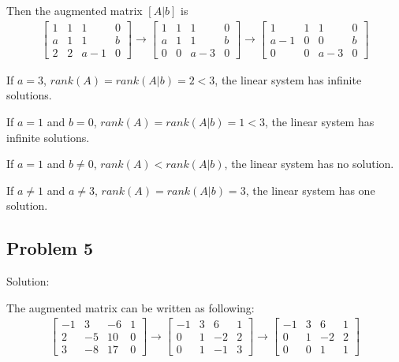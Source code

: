 \documentclass[letterpaper, 11pt]{article}
\newcommand{\1}{\mathds{1}}	%
\theoremstyle{definition}
\begin{document}
Then the augmented matrix $[A|b]$ is \begin{align*}
    \left[\begin{array}{ccc|c}
        1 & 1 & 1 & 0 \\
        a & 1 & 1 & b \\
        2 & 2 & a-1 & 0
    \end{array}\right] \to \left[\begin{array}{ccc|c}
        1 & 1 & 1 & 0 \\
        a & 1 & 1 & b \\
        0 & 0 & a-3 & 0
    \end{array}\right] \to \left[\begin{array}{ccc|c}
        1 & 1 & 1 & 0 \\
        a -1 & 0 & 0 & b \\
        0 & 0 & a-3 & 0
    \end{array}\right]
\end{align*}

If $a = 3$, $rank(A)=rank(A|b) = 2< 3$, the linear system has infinite solutions.

If $a = 1$ and $b = 0$, $rank(A)=rank(A|b) =1 < 3$, the linear system has infinite solutions.

If $a = 1$ and $b \neq 0$, $rank(A) < rank(A|b)$, the linear system has no solution.

If $a \neq 1$ and $a \neq 3$,  $rank(A)=rank(A|b) = 3$, the linear system has one solution.


\subsection*{Problem 5}

Solution:

The augmented matrix can be written as following:
\begin{align*}
    \left[\begin{array}{ccc|c}
        -1 & 3 & -6 & 1 \\
        2 & -5 & 10 & 0 \\
        3 & -8 & 17 & 0
    \end{array}\right] \to  \left[\begin{array}{ccc|c}
        -1 & 3 & 6 & 1 \\
        0 & 1 & -2 & 2 \\
        0 & 1 & -1 & 3
    \end{array}\right] \to \left[\begin{array}{ccc|c}
        -1 & 3 & 6 & 1 \\
        0 & 1 & -2 & 2 \\
        0 & 0 & 1 & 1
    \end{array}\right]
\end{align*}
\end{document}
